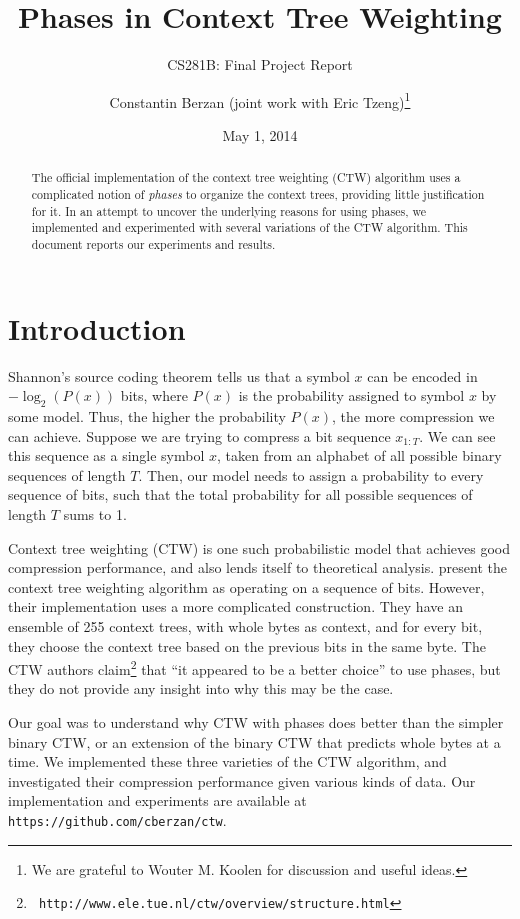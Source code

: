 \documentclass[11pt]{scrartcl}
\title{Phases in Context Tree Weighting}
\subtitle{CS281B: Final Project Report}
\author{Constantin Berzan (joint work with Eric Tzeng)\footnote{We are grateful
to Wouter M. Koolen for discussion and useful ideas.}}
\date{May 1, 2014}
\begin{document}
\maketitle

\begin{abstract}
The official implementation of the context tree weighting (CTW) algorithm uses
a complicated notion of {\em phases} to organize the context trees, providing
little justification for it. In an attempt to uncover the underlying reasons
for using phases, we implemented and experimented with several variations of
the CTW algorithm. This document reports our experiments and results.
\end{abstract}

\section{Introduction}
\label{sec:intro}

Shannon's source coding theorem tells us that a symbol $x$ can be encoded in
$-\log_2(P(x))$ bits, where $P(x)$ is the probability assigned to symbol $x$ by
some model. Thus, the higher the probability $P(x)$, the more compression we
can achieve. Suppose we are trying to compress a bit sequence $x_{1:T}$. We can
see this sequence as a single symbol $x$, taken from an alphabet of all
possible binary sequences of length $T$. Then, our model needs to assign a
probability to every sequence of bits, such that the total probability for all
possible sequences of length $T$ sums to 1.

Context tree weighting (CTW) is one such probabilistic model that achieves good
compression performance, and also lends itself to theoretical analysis.
\textcite{eidma} present the context tree weighting algorithm as operating on a
sequence of bits. However, their implementation uses a more complicated
construction. They have an ensemble of 255 context trees, with whole bytes as
context, and for every bit, they choose the context tree based on the previous
bits in the same byte. The CTW authors claim\footnote{{\tt
http://www.ele.tue.nl/ctw/overview/structure.html}} that ``it appeared to be a
better choice'' to use phases, but they do not provide any insight into why
this may be the case.

Our goal was to understand why CTW with phases does better than the simpler
binary CTW, or an extension of the binary CTW that predicts whole bytes at a
time. We implemented these three varieties of the CTW algorithm, and
investigated their compression performance given various kinds of data. Our
implementation and experiments are available at {\tt
https://github.com/cberzan/ctw}.
\end{document}
